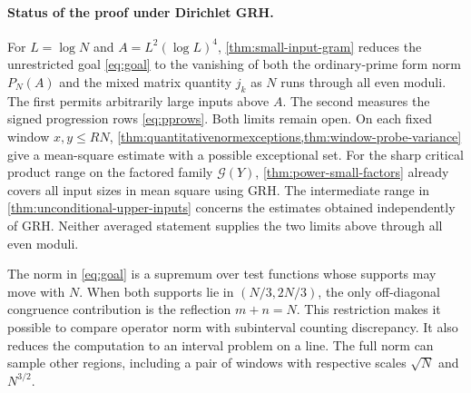 \documentclass[11pt,a4paper]{article}
\numberwithin{equation}{section}
\begin{document}
\paragraph{Status of the proof under Dirichlet GRH.}
For $L=\log N$ and $A=L^2(\log L)^4$, \cref{thm:small-input-gram}
reduces the unrestricted goal \eqref{eq:goal} to the vanishing
of both the ordinary-prime form norm $P_N(A)$ and the mixed
matrix quantity $j_k$ as $N$ runs through all even moduli.
The first permits arbitrarily large inputs above $A$. The second
measures the signed progression rows \eqref{eq:pprows}.
Both limits remain open. On each fixed window $x,y\le RN$,
\cref{thm:quantitativenormexceptions,thm:window-probe-variance}
give a mean-square estimate with a possible exceptional set.
For the sharp critical product range on the factored family
$\mathcal G(Y)$, \cref{thm:power-small-factors} already covers
all input sizes in mean square using GRH. The intermediate
range in \cref{thm:unconditional-upper-inputs} concerns the
estimates obtained independently of GRH. Neither averaged
statement supplies the two limits above through all even moduli.

The norm in \cref{eq:goal} is a supremum over test functions whose supports
may move with $N$. When both supports lie in $(N/3,2N/3)$, the only
off-diagonal congruence contribution is the reflection $m+n=N$. This
restriction makes it possible to compare operator norm with subinterval
counting discrepancy. It also reduces the computation to an interval
problem on a line. The full norm can sample other regions, including a
pair of windows with respective scales $\sqrt N$ and $N^{3/2}$.
\end{document}
